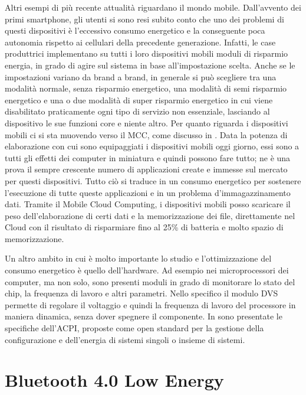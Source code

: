 Altri esempi di più recente attualità riguardano il mondo mobile. Dall'avvento dei primi smartphone, gli utenti si sono resi subito conto che uno dei problemi di questi dispositivi è l'eccessivo consumo energetico e la conseguente poca autonomia rispetto ai cellulari della precedente generazione. Infatti, le case produttrici implementano su tutti i loro dispositivi mobili moduli di risparmio energia, in grado di agire sul sistema in base all'impostazione scelta. Anche se le impostazioni variano da brand a brand, in generale si può scegliere tra una modalità normale, senza risparmio energetico, una modalità di semi risparmio energetico e una o due modalità di super risparmio energetico in cui viene disabilitato praticamente ogni tipo di servizio non essenziale, lasciando al dispositivo le sue funzioni core e niente altro. Per quanto riguarda i dispositivi mobili ci si sta muovendo verso il \acf{MCC}, come discusso in \cite{DinhLeeNiyatoWand2013-surveyMCC} . Data la potenza di elaborazione con cui sono equipaggiati i dispositivi mobili oggi giorno, essi sono a tutti gli effetti dei computer in miniatura e quindi possono fare tutto; ne è una prova il sempre crescente numero di applicazioni create e immesse sul mercato per questi dispositivi. Tutto ciò si traduce in un consumo energetico per sostenere l'esecuzione di tutte queste applicazioni e in un problema d'immagazzinamento dati. Tramite il Mobile Cloud Computing, i dispositivi mobili posso scaricare il peso dell'elaborazione di certi dati e la memorizzazione dei file, direttamente nel Cloud con il risultato di risparmiare fino al 25\% di batteria e molto spazio di memorizzazione.

Un altro ambito in cui è molto importante lo studio e l'ottimizzazione del consumo energetico è quello dell'hardware. Ad esempio nei microprocessori dei computer, ma non solo, sono presenti moduli in grado di monitorare lo stato del chip, la frequenza di lavoro e altri parametri. Nello specifico il modulo \acf{DVS} permette di regolare il voltaggio e quindi la frequenza di lavoro del processore in maniera dinamica, senza dover spegnere il componente. In \cite{MarzollaMirandola2013-dpm} sono presentate le specifiche dell'\acf{ACPI}, proposte come open standard per la gestione della configurazione e dell'energia di sistemi singoli o insieme di sistemi.
\bigskip

 \section{Bluetooth 4.0 Low Energy}
 \label{sec:ble}

